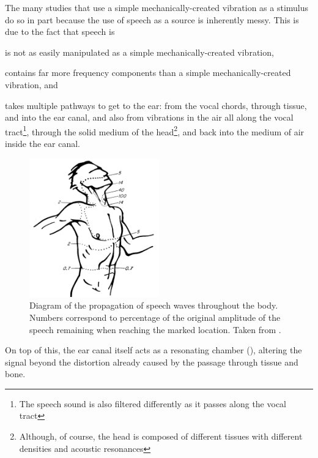 The many studies that use a simple mechanically-created vibration as a stimulus do so in part because the use of speech as a source is inherently messy.  This is due to the fact that speech is 
\begin{enumerate*}[label={\alph*)}]
  \item  is not as easily manipulated as a simple mechanically-created vibration,
  \item  contains far more frequency components than a simple mechanically-created vibration, and 
  \item  takes multiple pathways to get to the ear: from the vocal chords, through tissue, and into the ear canal, and also from vibrations in the air all along the vocal tract\footnote{The speech sound is also filtered differently as it passes along the vocal tract}, through the solid medium of the head\footnote{Although, of course, the head is composed of different tissues with different densities and acoustic resonances}, and back into the medium of air inside the ear canal.
\end{enumerate*}
% 
\begin{figure}
\centering
  \includegraphics[width=0.5\textwidth]{figure/bekesy60-3b.png}
  \caption{Diagram of the propagation of speech waves throughout the body. Numbers correspond to percentage of the original amplitude of the speech remaining when reaching the marked location. Taken from \cite{bekesy:60}.}
  \label{fig:bekesyBodyTransfer}
\end{figure}
%
On top of this, the ear canal itself acts as a resonating chamber (\cite{rosen:91}), altering the signal beyond the distortion already caused by the passage through tissue and bone.  



